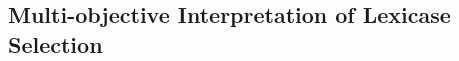 \documentclass[twoside]{article}
\begin{document}
%


 


\subsection{Multi-objective Interpretation of Lexicase Selection}\label{s:mo}
\end{document}
